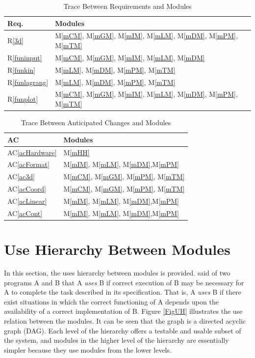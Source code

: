 \documentclass[12pt, titlepage]{article}
\newcommand{\acref}[1]{AC\ref{#1}}
\newcommand{\mref}[1]{M\ref{#1}}
\newcommand{\rref}[1]{R\ref{#1}}
\begin{document}
\begin{table}[H]
\centering
\begin{tabular}{p{} p{}}
\toprule
\textbf{Req.} & \textbf{Modules}\\
\midrule
\rref{3d} & \mref{mCM}, \mref{mGM}, \mref{mIM}, \mref{mLM}, \mref{mDM}, 
\mref{mPM}, \mref{mTM}\\
\rref{funinput}  & \mref{mCM}, \mref{mGM}, \mref{mIM}, \mref{mLM}, \mref{mDM}\\
\rref{funkin} & \mref{mLM}, \mref{mDM}, \mref{mPM}, \mref{mTM}\\
\rref{funlagrang}  & \mref{mLM}, \mref{mDM}, \mref{mPM}, \mref{mTM}\\
\rref{funplot} & \mref{mCM}, \mref{mGM}, \mref{mIM}, \mref{mLM}, \mref{mDM}, 
\mref{mPM}, \mref{mTM}\\
\bottomrule
\end{tabular}
\caption{Trace Between Requirements and Modules}
\label{TblRT}
\end{table}

\begin{table}[H]
\centering
\begin{tabular}{p{} p{}}
\toprule
\textbf{AC} & \textbf{Modules}\\
\midrule
\acref{acHardware} & \mref{mHH}\\
\acref{acFormat} & \mref{mIM}, \mref{mLM}, \mref{mDM},\mref{mPM}\\
\acref{ac3d} & \mref{mCM}, \mref{mGM}, \mref{mPM}, \mref{mTM}\\
\acref{acCoord} & \mref{mCM}, \mref{mGM}, \mref{mPM}, \mref{mTM}\\
\acref{acLinear} & \mref{mIM}, \mref{mLM}, \mref{mDM},\mref{mPM}\\
\acref{acCont} & \mref{mIM}, \mref{mLM}, \mref{mDM},\mref{mPM}\\
\bottomrule
\end{tabular}
\caption{Trace Between Anticipated Changes and Modules}
\label{TblACT}
\end{table}

\section{Use Hierarchy Between Modules} \label{SecUse}

In this section, the uses hierarchy between modules is provided. 
\citet{Parnas1978} said of two programs A and B that A {\em uses} B if
correct execution of B may be necessary for A to complete the task described in
its specification. That is, A {\em uses} B if there exist situations in which
the correct functioning of A depends upon the availability of a correct
implementation of B.  Figure \ref{FigUH} illustrates the use relation between
the modules. It can be seen that the graph is a directed acyclic graph
(DAG). Each level of the hierarchy offers a testable and usable subset of the
system, and modules in the higher level of the hierarchy are essentially 
simpler because they use modules from the lower levels.
\end{document}
